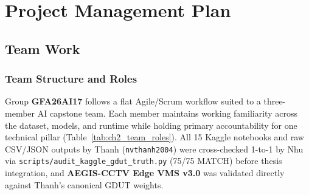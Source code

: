 \chapter{Project Management Plan}
\label{chap:pmp}

\section{Team Work}

\subsection{Team Structure and Roles}

Group \textbf{GFA26AI17} follows a flat Agile/Scrum workflow suited to a three-member AI capstone team. Each member maintains working familiarity across the dataset, models, and runtime while holding primary accountability for one technical pillar (Table~\ref{tab:ch2_team_roles}). All 15 Kaggle notebooks and raw CSV/JSON outputs by Thanh (\texttt{nvthanh2004}) were cross-checked 1-to-1 by Nhu via \nolinkurl{scripts/audit_kaggle_gdut_truth.py} (75/75 MATCH) before thesis integration, and \textbf{AEGIS-CCTV Edge VMS v3.0} was validated directly against Thanh's canonical GDUT weights.

